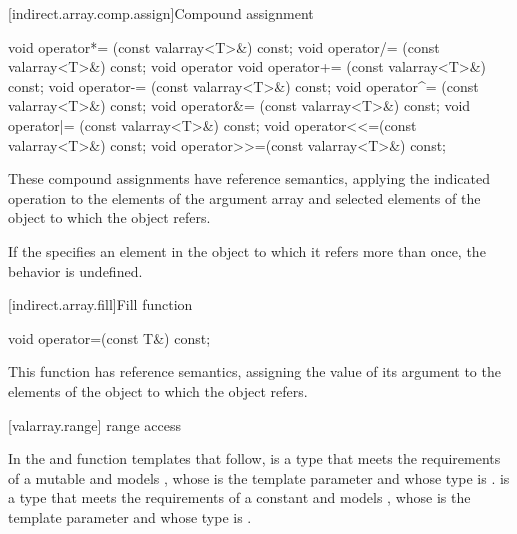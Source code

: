 [indirect.array.comp.assign]{Compound assignment}

%
%
%
%
%
%
%
%
%
%
\begin{itemdecl}
void operator*= (const valarray<T>&) const;
void operator/= (const valarray<T>&) const;
void operator%
void operator+= (const valarray<T>&) const;
void operator-= (const valarray<T>&) const;
void operator^= (const valarray<T>&) const;
void operator&= (const valarray<T>&) const;
void operator|= (const valarray<T>&) const;
void operator<<=(const valarray<T>&) const;
void operator>>=(const valarray<T>&) const;
\end{itemdecl}

\begin{itemdescr}
\pnum
These compound assignments have reference semantics, applying the indicated
operation to the elements of the argument array and selected elements of the
object to which the
object refers.

\pnum
If the
specifies an element in the
object to which it refers more than once,
the behavior is undefined.
\end{itemdescr}

[indirect.array.fill]{Fill function}

%
\begin{itemdecl}
void operator=(const T&) const;
\end{itemdecl}

\begin{itemdescr}
\pnum
This function has reference semantics, assigning the value of its argument
to the elements of the
object to which the
object refers.
\end{itemdescr}

[valarray.range]{ range access}

\pnum
In the  and  function templates that follow, 
is a type that meets the requirements of a mutable
and models ,
whose  is the template
parameter  and whose  type is .  is a
type that meets the requirements of a constant
and models ,
whose  is the template
parameter  and whose  type is .

